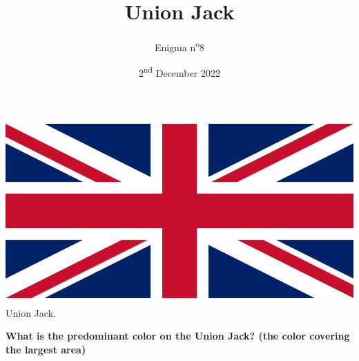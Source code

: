 \documentclass[a4paper, top=10mm]{article}
\title{\textbf{\huge{Union Jack}}}
\author{Enigma n\textsuperscript{o}8}
\date{2\textsuperscript{nd} December 2022}
\begin{document}
	\maketitle
	
	\begin{center}
		\includegraphics[height=200pt]{08uk_flag.png}\\
		Union Jack.
	\end{center}
	
	\vspace{3cm}
	
	\textbf{What is the predominant color on the Union Jack? (the color covering the largest area)}
	
	
\end{document}
